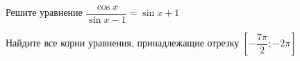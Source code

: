 \begin{ex}
	\begin{condition}
		\begin{enumcols}[label=\asbuk*)]
			\item Решите уравнение \( \dfrac{\cos x}{\sin x - 1} = \sin x + 1 \)
			\item Найдите все корни уравнения, принадлежащие отрезку \( \left[-\dfrac{7\pi}{2};-2\pi\right] \)
		\end{enumcols}
	\end{condition}
\end{ex}